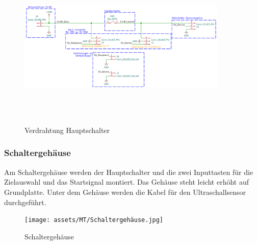 \begin{figure}[H]
\centering
\includegraphics[width=10cm, height=8cm]{assets/ET/PINOUT/Speissung.png}
\caption{Verdrahtung Hauptschalter}
\label{fig: Verdrahtung Hauptschalter}
\end{figure}

\subsubsection{Schaltergehäuse}

Am Schaltergehäuse werden der Hauptschalter und die zwei Inputtasten für die Zielauswahl und das Startsignal montiert. Das Gehäuse steht leicht erhöht auf Grundplatte. Unter dem Gehäuse werden die Kabel für den Ultraschallsensor durchgeführt.



\begin{figure}[H]
\centering
\texttt{[image: assets/MT/Schaltergehäuse.jpg]}
\caption{Schaltergehäuse}
\label{fig:Schaltergehäuse}
\end{figure}

